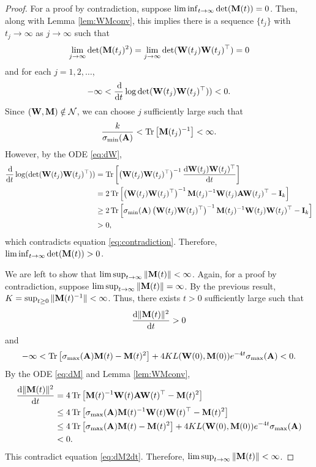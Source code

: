 \documentclass[10pt,a4paper]{amsart}
\DeclareMathOperator{\tr}{Tr}
\newcommand{\A}{{\bf A}}
\newcommand{\I}{{\bf I}}
\newcommand{\M}{{\bf M}}
\newcommand{\W}{{\bf W}}
\newcommand{\calN}{\mathcal{N}}
\newcommand{\dd}{\operatorname{d}\!}
\newcommand{\inv}{^{-1}}
\begin{document}
\begin{proof}
    For a proof by contradiction, suppose $\liminf_{t\to\infty}\det(\M(t))=0$.
    Then, along with Lemma \ref{lem:WMconv}, this implies there is a sequence $\{t_j\}$ with $t_j\to\infty$ as $j\to\infty$ such that
        $$\lim_{j\to\infty}\det(\M(t_j)^2)=\lim_{j\to\infty}\det (\W(t_j)\W(t_j)^\top)=0$$
    and for each $j=1,2,\dots$,
    \begin{align*}
        -\infty<\frac{\dd}{\dd t}\log\det(\W(t_j)\W(t_j)^\top))<0.
    \end{align*}
    Since $(\W, \M)\notin \calN$, we can choose $j$ sufficiently large such that 
    \begin{align}\label{eq:contradiction}
        \frac{k}{\sigma_{\min}(\A)}<\tr\left[\M(t_j)\inv\right]<\infty.
    \end{align}
    However, by the ODE \eqref{eq:dW}, 
    \begin{align*}
        \frac{\dd}{\dd t}\log(\det(\W(t_j)\W(t_j)^\top)) & =\tr\left[\left(\W(t_j)\W(t_j)^\top\right)\inv \frac{\dd\W(t_j)\W(t_j)^\top}{\dd t}\right] \\
        & = 2\tr\left[\left(\W(t_j)\W(t_j)^\top\right)\inv\M(t_j)\inv\W(t_j)\A\W(t_j)^\top-\I_k\right] \\
        & \ge 2\tr\left[\sigma_{\min}(\A)\left(\W(t_j)\W(t_j)^\top\right)\inv\M(t_j)\inv\W(t_j)\W(t_j)^\top-\I_k\right] \\
        & > 0,
    \end{align*}
    which contradicts equation \eqref{eq:contradiction}.
    Therefore, $\liminf_{t\to\infty}\det(\M(t))>0$.

    We are left to show that $\limsup_{t\to\infty}\|\M(t)\|<\infty$. Again, for a proof by contradiction, suppose $\limsup_{t\to\infty}\|\M(t)\|=\infty$. 
    By the previous result, $K=\sup_{t\ge0}\|\M(t)^{-1}\|<\infty$.
    Thus, there exists $t>0$ sufficiently large such that
    \begin{align}\label{eq:dM2dt}
        \frac{\dd\|\M(t)\|^2}{\dd t}>0
    \end{align}
    and
    \begin{align*}
        -\infty<\tr\left[\sigma_{\max}(\A)\M(t) -\M(t)^2\right]+ 4KL(\W(0),\M(0)) e^{-4t}\sigma_{\max}(\A)<0.
    \end{align*}
    By the ODE \eqref{eq:dM} and Lemma \ref{lem:WMconv},
    \begin{align*}
        \frac{\dd\|\M(t)\|^2}{\dd t} &=4\tr\left[\M(t)\inv\W(t)\A\W(t)^\top-\M(t)^2\right]   \\
        &\leq 4\tr\left[\sigma_{\max}(\A)\M(t)\inv\W(t)\W(t)^\top-\M(t)^2\right]  \\
        &\leq 4\tr\left[\sigma_{\max}(\A)\M(t) -\M(t)^2\right]+ 4KL(\W(0),\M(0)) e^{-4t}\sigma_{\max}(\A)\\
        &<0.
    \end{align*}
    This contradict equation \eqref{eq:dM2dt}.
    Therefore, $\limsup_{t\to\infty}\|\M(t)\|<\infty$.
\end{proof}
\end{document}

